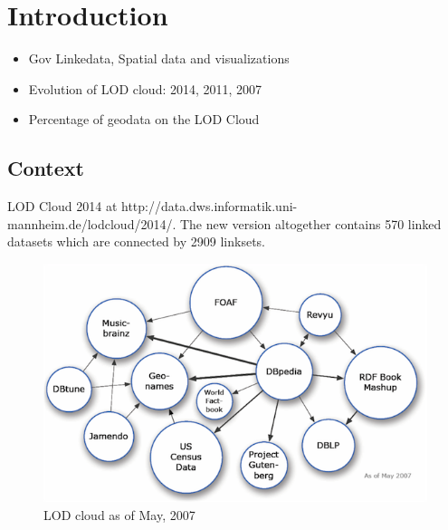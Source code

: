 \chapter{Introduction}
\label{intro}

\begin{itemize}
\item Gov Linkedata, Spatial data and visualizations
\item Evolution of LOD cloud: 2014, 2011, 2007
\item Percentage of geodata on the LOD Cloud
\end{itemize}

\section{Context}
\label{sec:context}


LOD Cloud 2014 at http://data.dws.informatik.uni-mannheim.de/lodcloud/2014/. The new version altogether contains 570 linked datasets which are connected by 2909 linksets.

\begin{figure}[ht!]
\includegraphics[scale=0.9]{img/lod-cloud2007.png}
\caption{LOD cloud as of May, 2007}
\label{fig:lodcloud2007}
\end{figure}

